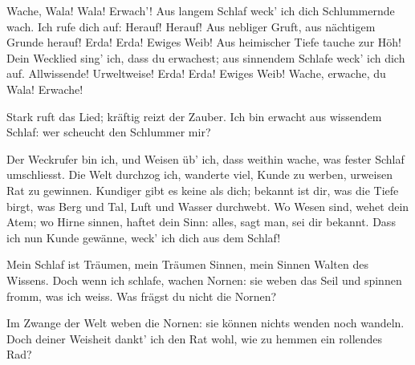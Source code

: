 \begin{drama}
\act

\scene


\Wandererspeaks


Wache, Wala!
Wala! Erwach'!
Aus langem Schlaf
weck' ich dich Schlummernde wach.
Ich rufe dich auf:
Herauf! Herauf!
Aus nebliger Gruft,
aus nächtigem Grunde herauf!
Erda! Erda!
Ewiges Weib!
Aus heimischer Tiefe
tauche zur Höh!
Dein Wecklied sing' ich,
dass du erwachest;
aus sinnendem Schlafe
weck' ich dich auf.
Allwissende!
Urweltweise!
Erda! Erda!
Ewiges Weib!
Wache, erwache,
du Wala! Erwache!


\Erdaspeaks

Stark ruft das Lied;
kräftig reizt der Zauber.
Ich bin erwacht
aus wissendem Schlaf:
wer scheucht den Schlummer mir?

\Wandererspeaks

Der Weckrufer bin ich,
und Weisen üb' ich,
dass weithin wache,
was fester Schlaf umschliesst.
Die Welt durchzog ich,
wanderte viel,
Kunde zu werben,
urweisen Rat zu gewinnen.
Kundiger gibt es
keine als dich;
bekannt ist dir,
was die Tiefe birgt,
was Berg und Tal,
Luft und Wasser durchwebt.
Wo Wesen sind,
wehet dein Atem;
wo Hirne sinnen,
haftet dein Sinn:
alles, sagt man,
sei dir bekannt.
Dass ich nun Kunde gewänne,
weck' ich dich aus dem Schlaf!

\Erdaspeaks

Mein Schlaf ist Träumen,
mein Träumen Sinnen,
mein Sinnen Walten des Wissens.
Doch wenn ich schlafe,
wachen Nornen:
sie weben das Seil
und spinnen fromm, was ich weiss.
Was frägst du nicht die Nornen?

\Wandererspeaks

Im Zwange der Welt
weben die Nornen:
sie können nichts wenden noch wandeln.
Doch deiner Weisheit
dankt' ich den Rat wohl,
wie zu hemmen ein rollendes Rad?


\end{drama}
